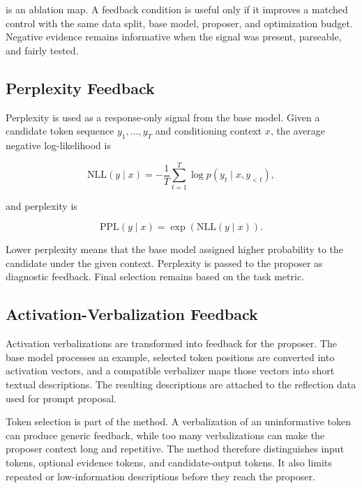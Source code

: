 \documentclass[12pt,a4paper,twoside,openright]{book}
\begin{document}
 is an ablation map. A feedback condition is
useful only if it improves a matched control with the same data split, base
model, proposer, and optimization budget. Negative evidence remains informative
when the signal was present, parseable, and fairly tested.

\subsection{Perplexity Feedback}
\label{sec:method-perplexity-feedback}

Perplexity is used as a response-only signal from the base model. Given a
candidate token sequence $y_1,\ldots,y_T$ and conditioning context $x$,
the average negative log-likelihood is

\[
\mathrm{NLL}(y \mid x) =
-\frac{1}{T}\sum_{t=1}^{T}\log p(y_t \mid x, y_{<t}),
\]

and perplexity is

\[
\mathrm{PPL}(y \mid x) = \exp(\mathrm{NLL}(y \mid x)).
\]

Lower perplexity means that the base model assigned higher probability to the
candidate under the given context. Perplexity is passed to the proposer as
diagnostic feedback. Final selection remains based on the task metric.

\subsection{Activation-Verbalization Feedback}
\label{sec:method-nla-feedback}

Activation verbalizations are transformed into feedback for the proposer. The
base model processes an example, selected token positions are converted into
activation vectors, and a compatible verbalizer maps those vectors into short
textual descriptions. The resulting descriptions are attached to the reflection
data used for prompt proposal.

Token selection is part of the method. A verbalization of an uninformative token
can produce generic feedback, while too many verbalizations can make the
proposer context long and repetitive. The method therefore distinguishes input
tokens, optional evidence tokens, and candidate-output tokens. It also limits
repeated or low-information descriptions before they reach the proposer.
\end{document}
